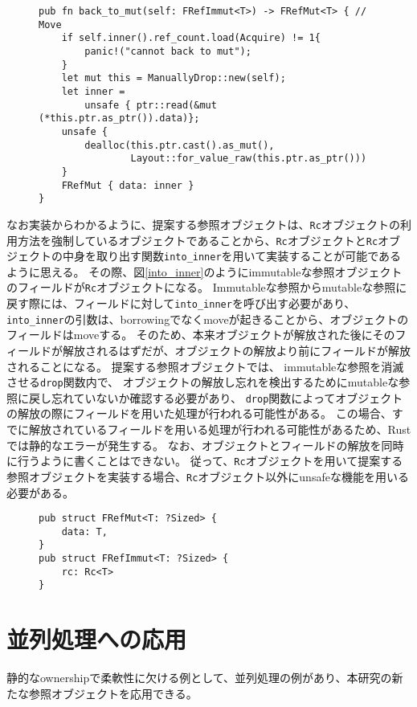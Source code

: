 \documentclass{sumiilab-paper}
\theoremstyle{mystyle}
\numberwithin{definition}{chapter} %
\begin{document}
\begin{figure}[htp]
\begin{lstlisting}[caption=関数back\_to\_mutの実装, label=back_implementation, captionpos=b]
pub fn back_to_mut(self: FRefImmut<T>) -> FRefMut<T> { // Move
    if self.inner().ref_count.load(Acquire) != 1{
        panic!("cannot back to mut");
    }
    let mut this = ManuallyDrop::new(self);
    let inner =
        unsafe { ptr::read(&mut (*this.ptr.as_ptr()).data)};
    unsafe {
        dealloc(this.ptr.cast().as_mut(), 
                Layout::for_value_raw(this.ptr.as_ptr()))
    }
    FRefMut { data: inner }
}
\end{lstlisting}
\end{figure}

なお実装からわかるように、提案する参照オブジェクトは、\texttt{Rc}オブジェクトの利用方法を強制しているオブジェクトであることから、\texttt{Rc}オブジェクトと\texttt{Rc}オブジェクトの中身を取り出す関数\texttt{into\_inner}を用いて実装することが可能であるように思える。
その際、図\ref{into_inner}のようにimmutableな参照オブジェクトのフィールドが\texttt{Rc}オブジェクトになる。
Immutableな参照からmutableな参照に戻す際には、フィールドに対して\texttt{into\_inner}を呼び出す必要があり、
\texttt{into\_inner}の引数は、borrowingでなくmoveが起きることから、オブジェクトのフィールドはmoveする。
そのため、本来オブジェクトが解放された後にそのフィールドが解放されるはずだが、オブジェクトの解放より前にフィールドが解放されることになる。
提案する参照オブジェクトでは、
immutableな参照を消滅させる\texttt{drop}関数内で、
オブジェクトの解放し忘れを検出するためにmutableな参照に戻し忘れていないか確認する必要があり、
\texttt{drop}関数によってオブジェクトの解放の際にフィールドを用いた処理が行われる可能性がある。
この場合、すでに解放されているフィールドを用いる処理が行われる可能性があるため、Rustでは静的なエラーが発生する。
なお、オブジェクトとフィールドの解放を同時に行うように書くことはできない。
従って、\texttt{Rc}オブジェクトを用いて提案する参照オブジェクトを実装する場合、\texttt{Rc}オブジェクト以外にunsafeな機能を用いる必要がある。

\begin{figure}[htp]
\begin{lstlisting}[caption=Rcオブジェクトと関数into\_innerによる実装の試み, label=into_inner, captionpos=b]
pub struct FRefMut<T: ?Sized> {
    data: T,
}
pub struct FRefImmut<T: ?Sized> {
    rc: Rc<T>
}
\end{lstlisting}
\end{figure}

\chapter{並列処理への応用}
静的なownershipで柔軟性に欠ける例として、並列処理の例があり、本研究の新たな参照オブジェクトを応用できる。
\end{document}
